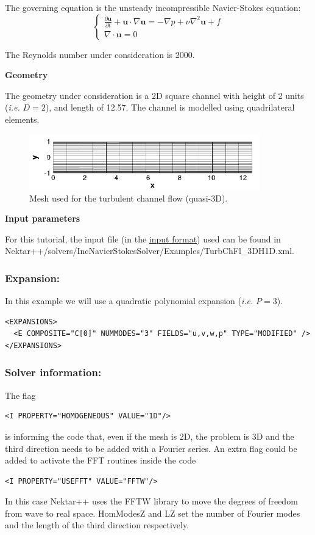 The governing equation is the unsteady incompressible Navier-Stokes equation:
\begin{equation}
\begin{cases}
\frac{\partial \textbf{u}}{\partial t} + \textbf{u} \cdot \nabla \textbf{u} = - \nabla p + \nu \nabla^2 \textbf{u} + f \\
\nabla \cdot \textbf{u} = 0
\label{IncNS_equations}
\end{cases}
\end{equation}

The Reynolds number under consideration is 2000.

\textbf{Geometry}

The geometry under consideration is a 2D square channel with height of 2 units (\textit{i.e.} $D=2$), and length of 12.57. The channel is modelled using quadrilateral elements.
\begin{figure}
\begin{center}
\includegraphics[width=10cm]{Figures/ChanMesh.png}
\caption{Mesh used for the turbulent channel flow (quasi-3D).}
\end{center}
\end{figure}

\textbf{Input parameters}

For this tutorial, the input file (in the \hyperref[XMLformat]{\nekpp input format}) used can be found in Nektar++/solvers/IncNavierStokesSolver/Examples/TurbChFl\_3DH1D.xml.

\subsubsection{Expansion:~} In this example we will use a quadratic polynomial expansion (\textit{i.e.} $P=3$).
\begin{lstlisting}[style=XMLStyle]
<EXPANSIONS>
  <E COMPOSITE="C[0]" NUMMODES="3" FIELDS="u,v,w,p" TYPE="MODIFIED" />
</EXPANSIONS>
\end{lstlisting}

\subsubsection{Solver information:~} The flag 
\begin{lstlisting}[style=XMLStyle]
<I PROPERTY="HOMOGENEOUS" VALUE="1D"/>
\end{lstlisting}
is informing the code that, even if the mesh is 2D, the problem is 3D and the third direction needs to be added with a Fourier series. An extra flag could be added to activate the FFT routines inside the code 
\begin{lstlisting}[style=XMLStyle]
<I PROPERTY="USEFFT" VALUE="FFTW"/>
\end{lstlisting}
In this case Nektar++ uses the FFTW library to move the degrees of freedom from wave to real space. HomModesZ and LZ set the number of Fourier modes and the length of the third direction respectively.

